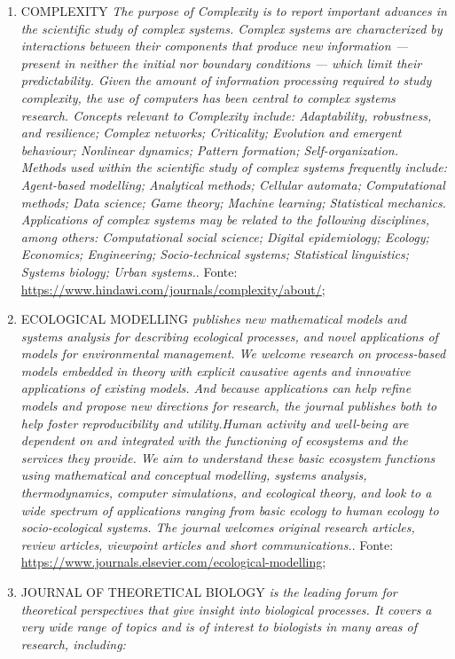 \begin{enumerate}
    \item COMPLEXITY \textit{\small The purpose of Complexity is to report important advances in the scientific study of complex systems. Complex systems are characterized by interactions between their components that produce new information — present in neither the initial nor boundary conditions — which limit their predictability. Given the amount of information processing required to study complexity, the use of computers has been central to complex systems research. Concepts relevant to Complexity include:
    Adaptability, robustness, and resilience;
    Complex networks;
    Criticality;
    Evolution and emergent behaviour;
    Nonlinear dynamics;
    Pattern formation;
    Self-organization.
Methods used within the scientific study of complex systems frequently include:
    Agent-based modelling;
    Analytical methods;
    Cellular automata;
    Computational methods;
    Data science;
    Game theory;
    Machine learning;
    Statistical mechanics.
Applications of complex systems may be related to the following disciplines, among others:
Computational social science;    Digital epidemiology;
    Ecology;
    Economics;
    Engineering;
    Socio-technical systems;
    Statistical linguistics;
    Systems biology;
    Urban systems.}. Fonte: \url{https://www.hindawi.com/journals/complexity/about/};
    \item ECOLOGICAL MODELLING \textit{\small publishes new mathematical models and systems analysis for describing ecological processes, and novel applications of models for environmental management.
We welcome research on process-based models embedded in theory with explicit causative agents and innovative applications of existing models. And because applications can help refine models and propose new directions for research, the journal publishes both to help foster reproducibility and utility.Human activity and well-being are dependent on and integrated with the functioning of ecosystems and the services they provide. We aim to understand these basic ecosystem functions using mathematical and conceptual modelling, systems analysis, thermodynamics, computer simulations, and ecological theory, and look to a wide spectrum of applications ranging from basic ecology to human ecology to socio-ecological systems. The journal welcomes original research articles, review articles, viewpoint articles and short communications.}. Fonte: \url{https://www.journals.elsevier.com/ecological-modelling};
    \item JOURNAL OF THEORETICAL BIOLOGY \textit{\small is the leading forum for theoretical perspectives that give insight into biological processes. It covers a very wide range of topics and is of interest to biologists in many areas of research, including:
}
\end{enumerate}
